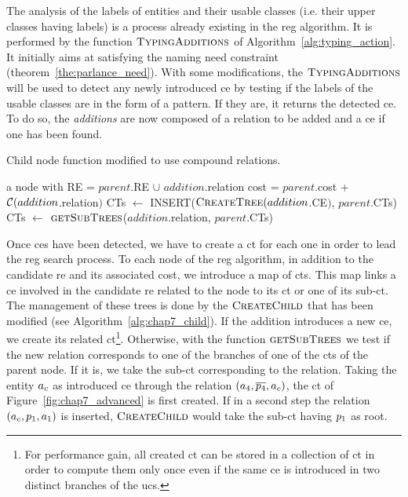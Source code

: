 The analysis of the labels of entities and their usable classes (i.e. their upper classes having labels) is a process already existing in the \acrshort{reg} algorithm. It is performed by the function $\textsc{TypingAdditions}$ of Algorithm~\ref{alg:typing_action}. It initially aims at satisfying the naming need constraint (theorem~\ref{the:parlance_need}). With some modifications, the $\textsc{TypingAdditions}$ will be used to detect any newly introduced \acrshort{ce} by testing if the labels of the usable classes are in the form of a pattern. If they are, it returns the detected \acrshort{ce}. To do so, the \textit{additions} are now composed of a relation to be added and a \acrshort{ce} if one has been found.

\begin{algorithm}[b!]
\caption{\label{alg:chap7_child} Child node function modified to use compound relations.}
\begin{algorithmic}
    \State \Return a node with
    \State RE = $parent$.RE $\cup$ $addition$.relation
    \State cost = $parent$.cost + $\mathcal{C}(addition$.relation$)$
    	\State CTs $\leftarrow$ INSERT($\textsc{CreateTree}(addition$.CE$)$, $parent$.CTs)
    \Else
    	\State CTs $\leftarrow$ $\textsc{getSubTrees}$($addition$.relation, $parent$.CTs)
    \EndIf
\EndFunction
\end{algorithmic}
\end{algorithm}

Once \acrshort{ce}s have been detected, we have to create a \acrfull{ct} for each one in order to lead the \acrshort{reg} search process. To each node of the \acrshort{reg} algorithm, in addition to the candidate \acrshort{re} and its associated cost, we introduce a map of \acrshort{ct}s. This map links a \acrshort{ce} involved in the candidate \acrshort{re} related to the node to its \acrshort{ct} or one of its sub-\acrshort{ct}. The management of these trees is done by the $\textsc{CreateChild}$ that has been modified (see Algorithm~\ref{alg:chap7_child}). If the addition introduces a new \acrshort{ce}, we create its related \acrshort{ct}\footnote{For performance gain, all created \acrshort{ct} can be stored in a collection of \acrshort{ct} in order to compute them only once even if the same \acrshort{ce} is introduced in two distinct branches of the \acrshort{ucs}.}. Otherwise, with the function $\textsc{getSubTrees}$ we test if the new relation corresponds to one of the branches of one of the \acrshort{ct}s of the parent node. If it is, we take the sub-\acrshort{ct} corresponding to the relation. Taking the entity $a_c$ as introduced \acrshort{ce} through the relation $(a_4, \overline{p_4}, a_c)$, the \acrshort{ct} of Figure~\ref{fig:chap7_advanced} is first created. If in a second step the relation $(a_c, p_1, a_1)$ is inserted, $\textsc{CreateChild}$ would take the sub-\acrshort{ct} having $p_1$ as root.

